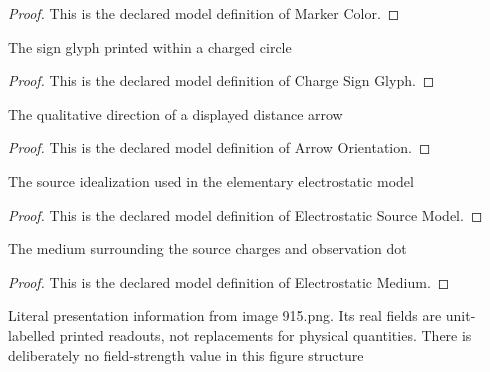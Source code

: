 \begin{proof}
  This is the declared model definition of Marker Color.
\end{proof}
\begin{definition}
  \label{def:physics:phyx-mini-0915:phyxminiproblems-problemphyxmini0915-chargesignglyph}
  The sign glyph printed within a charged circle
\end{definition}
\begin{proof}
  This is the declared model definition of Charge Sign Glyph.
\end{proof}
\begin{definition}
  \label{def:physics:phyx-mini-0915:phyxminiproblems-problemphyxmini0915-arroworientation}
  The qualitative direction of a displayed distance arrow
\end{definition}
\begin{proof}
  This is the declared model definition of Arrow Orientation.
\end{proof}
\begin{definition}
  \label{def:physics:phyx-mini-0915:phyxminiproblems-problemphyxmini0915-electrostaticsourcemodel}
  The source idealization used in the elementary electrostatic model
\end{definition}
\begin{proof}
  This is the declared model definition of Electrostatic Source Model.
\end{proof}
\begin{definition}
  \label{def:physics:phyx-mini-0915:phyxminiproblems-problemphyxmini0915-electrostaticmedium}
  The medium surrounding the source charges and observation dot
\end{definition}
\begin{proof}
  This is the declared model definition of Electrostatic Medium.
\end{proof}
\begin{definition}
  \label{def:physics:phyx-mini-0915:phyxminiproblems-problemphyxmini0915-dipolefieldfigure}
  Literal presentation information from image 915.png. Its real fields are unit-labelled printed readouts, not replacements for physical quantities. There is deliberately no field-strength value in this figure structure
\end{definition}
